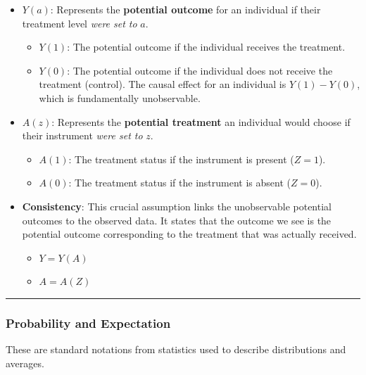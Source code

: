 \documentclass[
  letterpaper,
  DIV=11,
  numbers=noendperiod]{scrartcl}
\providecommand{\tightlist}{%
  \setlength{\itemsep}{0pt}\setlength{\parskip}{0pt}}
\begin{document}
\begin{itemize}
\tightlist
\item
  \textbf{\(Y(a)\)}: Represents the \textbf{potential outcome} for an
  individual if their treatment level \emph{were set to} \(a\).

  \begin{itemize}
  \tightlist
  \item
    \textbf{\(Y(1)\)}: The potential outcome if the individual receives
    the treatment.
  \item
    \textbf{\(Y(0)\)}: The potential outcome if the individual does not
    receive the treatment (control). The causal effect for an individual
    is \(Y(1) - Y(0)\), which is fundamentally unobservable.
  \end{itemize}
\item
  \textbf{\(A(z)\)}: Represents the \textbf{potential treatment} an
  individual would choose if their instrument \emph{were set to} \(z\).

  \begin{itemize}
  \tightlist
  \item
    \textbf{\(A(1)\)}: The treatment status if the instrument is present
    (\(Z=1\)).
  \item
    \textbf{\(A(0)\)}: The treatment status if the instrument is absent
    (\(Z=0\)).
  \end{itemize}
\item
  \textbf{Consistency}: This crucial assumption links the unobservable
  potential outcomes to the observed data. It states that the outcome we
  see is the potential outcome corresponding to the treatment that was
  actually received.

  \begin{itemize}
  \tightlist
  \item
    \(Y = Y(A)\)
  \item
    \(A = A(Z)\)
  \end{itemize}
\end{itemize}

\begin{center}\rule{0.5\linewidth}{0.5pt}\end{center}

\subsubsection{Probability and
Expectation}\label{probability-and-expectation}

These are standard notations from statistics used to describe
distributions and averages.
\end{document}
